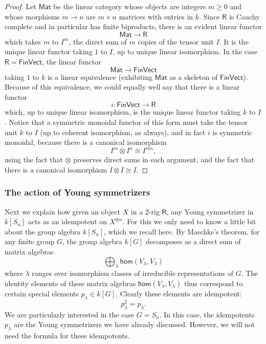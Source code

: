 \documentclass[12pt,reqno]{amsart}
\theoremstyle{plain}
\theoremstyle{definition}
\theoremstyle{remark}
\newcommand{\maps}{\colon}
\renewcommand{\hom}{\mathsf{hom}}
\newcommand{\category}[1]{\mathsf{#1}}
\newcommand{\R}{\category R}
\newcommand{\namedcat}[1]{\mathsf{#1}}
\newcommand{\Vect}{\namedcat{Vect}}
\newcommand{\Fin}{\namedcat{Fin}}
\newcommand{\Mat}{\namedcat{Mat}}
\numberwithin{thm}{section}
\begin{document}
\begin{proof}
    Let $\Mat$ be the linear category whose objects are integers $m \geq 0$ and whose morphisms $m \to n$ are $m \times n$ matrices with entries in $k$. Since $\R$ is Cauchy complete and in particular has finite biproducts, there is an evident linear functor 
    \[
        \Mat \to \R
    \] 
    which takes $m$ to $I^m$, the direct sum of $m$ copies of the tensor unit $I$. It is the unique linear functor taking $1$ to $I$, up to unique linear isomorphism. In the case $\R = \Fin\Vect$, the linear functor 
    \[
        \Mat \to \Fin\Vect
    \] 
    taking $1$ to $k$ is a linear equivalence (exhibiting $\Mat$ as a skeleton of $\Fin\Vect$). Because of this equivalence, we could equally well say that there is a linear functor 
    \[
        i \maps \Fin\Vect \to \R
    \] 
    which, up to unique linear isomorphism, is the unique linear functor taking $k$ to $I$. Notice that a symmetric monoidal functor of this form must take the tensor unit $k$ to $I$ (up to coherent isomorphism, as always), and in fact $i$ is symmetric monoidal, because there is a canonical isomorphism
    \[
        I^m \otimes I^n \cong I^{m n}, 
    \] 
    using the fact that $\otimes$ preserves direct sums in each argument, and the fact that there is a canonical isomorphism $I \otimes I \cong I$. 
\end{proof}

\subsubsection{The action of Young symmetrizers}

Next we explain how given an object $X$ in a 2-rig $\R$, any Young symmetrizer in $k[S_n]$ acts as an idempotent on $X^{\otimes n}$. 
For this we only need to know a little bit about the group algebra $k[S_n]$, which we recall here. By Maschke's theorem, for any finite group $G$, the group algebra $k[G]$ decomposes as a direct sum of matrix algebras 
\[
    \bigoplus_{\lambda} \hom(V_\lambda, V_\lambda)
\] 
where $\lambda$ ranges over isomorphism classes of irreducible representations of $G$. The identity elements of these matrix algebras $\hom(V_\lambda, V_\lambda)$ thus correspond to certain special elements $p_\lambda \in k[G]$. Clearly these elements are idempotent:
\[ 
    p_\lambda^2 = p_\lambda . 
\]
We are particularly interested in the case $G = S_n$. In this case, the idempotents $p_\lambda$ are the Young symmetrizers we have already discussed. However, we will not need the formula for these idempotents.
\end{document}

